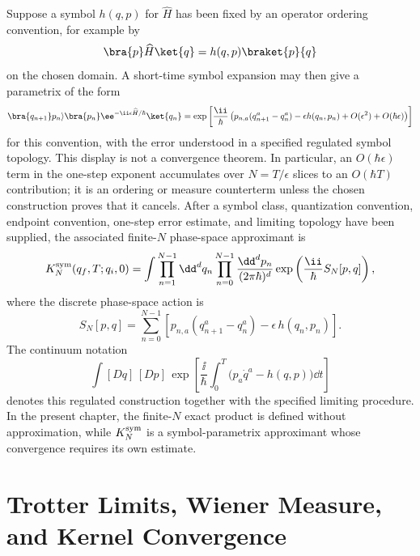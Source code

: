 Suppose a symbol \(h(q,p)\) for \(\widehat H\) has been fixed by an operator
ordering convention, for example by
\[
  \bra{p}\widehat H\ket{q}=h(q,p)\braket{p}{q}
\]
on the chosen domain.  A short-time symbol expansion may then give a
parametrix of the form
\[
  \bra{q_{n+1}}p_n\rangle
  \bra{p_n}\ee^{-\ii\epsilon\widehat H/\hbar}\ket{q_n}
  =
  \exp\left[
    \frac{\ii}{\hbar}
    \left(
      p_{n,a}(q_{n+1}^a-q_n^a)
      -\epsilon h(q_n,p_n)
      +O(\epsilon^2)+O(\hbar\epsilon)
    \right)
  \right]
\]
for this convention, with the error understood in a specified regulated symbol
topology.  This display is not a convergence theorem.  In particular, an
\(O(\hbar\epsilon)\) term in the one-step exponent accumulates over
\(N=T/\epsilon\) slices to an \(O(\hbar T)\) contribution; it is an ordering or
measure counterterm unless the chosen construction proves that it cancels.
After a symbol class, quantization convention, endpoint convention, one-step
error estimate, and limiting topology have been supplied, the associated
finite-\(N\) phase-space approximant is
\[
  K_N^{\rm sym}(q_f,T;q_i,0)
  =
  \int
  \prod_{n=1}^{N-1}\dd^dq_n
  \prod_{n=0}^{N-1}\frac{\dd^dp_n}{(2\pi\hbar)^d}
  \exp\left(\frac{\ii}{\hbar}S_N[p,q]\right),
\]
where the discrete phase-space action is
\[
  S_N[p,q]
  =
  \sum_{n=0}^{N-1}
  \left[
    p_{n,a}(q_{n+1}^a-q_n^a)
    -\epsilon\,h(q_n,p_n)
  \right].
\]
The continuum notation
\[
  \int [Dq]\,[Dp]\,
  \exp\left[
    \frac{\ii}{\hbar}\int_0^T
    \bigl(p_a\dot q^a-h(q,p)\bigr)\dd t
  \right]
\]
denotes this regulated construction together with the specified limiting
procedure.  In the present chapter, the finite-\(N\) exact product is defined
without approximation, while \(K_N^{\rm sym}\) is a symbol-parametrix
approximant whose convergence requires its own estimate.

\section{Trotter Limits, Wiener Measure, and Kernel Convergence}


